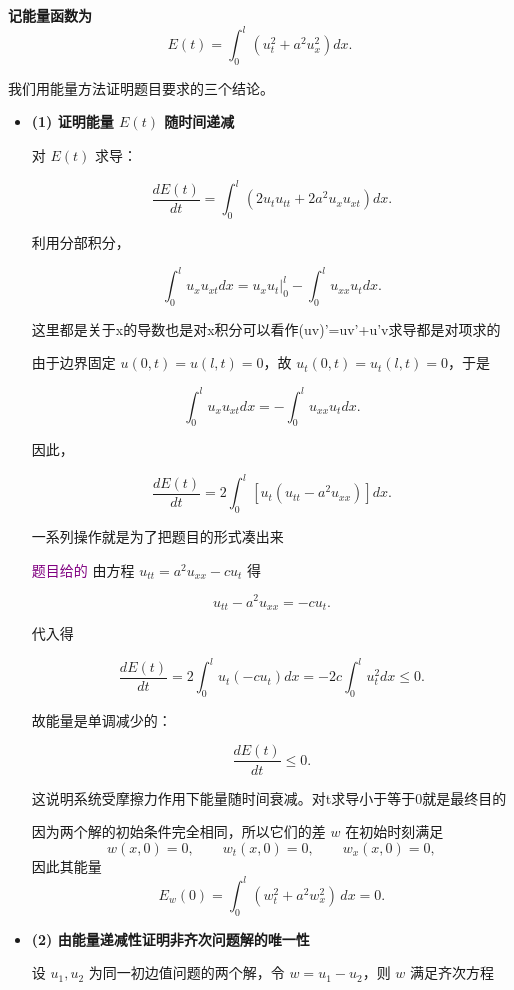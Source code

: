 \begin{solution}

\textbf{记能量函数为}
\[
E(t)=\int_{0}^{l}\left( u_t^2 + a^{2} u_x^{2}\right)dx .
\]

我们用能量方法证明题目要求的三个结论。

\begin{itemize}

\item \textbf{(1) 证明能量 $E(t)$ 随时间递减}

对 $E(t)$ 求导：

\[
\frac{dE(t)}{dt}
=\int_{0}^{l}\left(2u_tu_{tt}+2a^{2}u_xu_{xt}\right)dx .
\]

利用分部积分，

\[
\int_0^l u_x u_{xt}dx
= u_x u_t\bigg|_{0}^{l}-\int_0^l u_{xx}u_tdx .
\]
\begin{dxtips}
    这里都是关于x的导数也是对x积分可以看作(uv)'=uv'+u'v求导都是对项求的
\end{dxtips}
由于边界固定 $u(0,t)=u(l,t)=0$，故 $u_t(0,t)=u_t(l,t)=0$，于是

\[
\int_0^l u_x u_{xt}dx
=-\int_0^l u_{xx}u_tdx .
\]

因此，

\[
\frac{dE(t)}{dt}
=2\int_0^l \left[u_t(u_{tt}-a^{2}u_{xx})\right]dx .
\]
\begin{dxtips}
    一系列操作就是为了把题目的形式凑出来
\end{dxtips}
\textcolor{purple}{题目给的}
由方程 $u_{tt}=a^{2}u_{xx}-cu_t$ 得

\[
u_{tt}-a^{2}u_{xx}=-cu_t .
\]

代入得

\[
\frac{dE(t)}{dt}
=2\int_0^l u_t(-cu_t)dx
=-2c\int_0^l u_t^{2}dx \le 0.
\]

故能量是单调减少的：

\[
\boxed{\frac{dE(t)}{dt}\le0}.
\]

这说明系统受摩擦力作用下能量随时间衰减。对t求导小于等于0就是最终目的

\begin{dxtips}
    因为两个解的初始条件完全相同，所以它们的差 $w$ 在初始时刻满足
\[
w(x,0)=0,\qquad w_t(x,0)=0,\qquad w_x(x,0)=0,
\]
因此其能量
\[
E_w(0)=\int_0^l \left(w_t^2 + a^2 w_x^2\right)\,dx = 0.
\]
\end{dxtips}
\item \textbf{(2) 由能量递减性证明非齐次问题解的唯一性}

设 $u_1,u_2$ 为同一初边值问题的两个解，令 $w=u_1-u_2$，则 $w$ 满足齐次方程


\end{itemize}
\end{solution}
